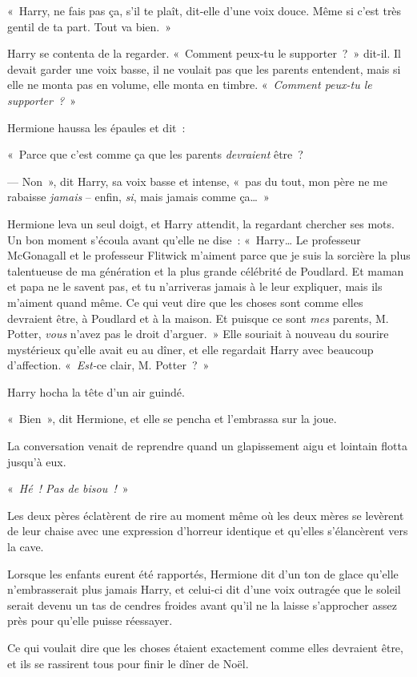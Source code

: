 «~Harry, ne fais pas ça, s'il te plaît, dit-elle d'une voix douce.
Même si c'est très gentil de ta part.
Tout va bien.~»

Harry se contenta de la regarder.
«~Comment peux-tu le supporter~?~»
dit-il. Il devait garder une voix basse, il ne voulait pas que les parents entendent, mais si elle ne monta pas en volume, elle monta en timbre.
«~\emph{Comment peux-tu le supporter~?}~»

Hermione haussa les épaules et dit~:

«~Parce que c'est comme ça que les parents \emph{devraient} être~?

--- Non~», dit Harry, sa voix basse et intense, «~pas du tout, mon père ne me rabaisse \emph{jamais} -- enfin, \emph{si}, mais jamais comme ça…~»

Hermione leva un seul doigt, et Harry attendit, la regardant chercher ses mots.
Un bon moment s'écoula avant qu'elle ne dise~: «~Harry…
Le professeur McGonagall et le professeur Flitwick m'aiment parce que je suis la sorcière la plus talentueuse de ma génération et la plus grande célébrité de Poudlard.
Et maman et papa ne le savent pas, et tu n'arriveras jamais à le leur expliquer, mais ils m'aiment quand même.
Ce qui veut dire que les choses sont comme elles devraient être, à Poudlard et à la maison.
Et puisque ce sont \emph{mes} parents, M. Potter, \emph{vous} n'avez pas le droit d'arguer.~»
Elle souriait à nouveau du sourire mystérieux qu'elle avait eu au dîner, et elle regardait Harry avec beaucoup d'affection.
«~\emph{Est-}ce clair, M. Potter~?~»

Harry hocha la tête d'un air guindé.

«~Bien~», dit Hermione, et elle se pencha et l'embrassa sur la joue.

\later

La conversation venait de reprendre quand un glapissement aigu et lointain flotta jusqu'à eux.

«~\emph{Hé~!
Pas de bisou~!}~»

Les deux pères éclatèrent de rire au moment même où les deux mères se levèrent de leur chaise avec une expression d'horreur identique et qu'elles s'élancèrent vers la cave.

Lorsque les enfants eurent été rapportés, Hermione dit d'un ton de glace qu'elle n'embrasserait plus jamais Harry, et celui-ci dit d'une voix outragée que le soleil serait devenu un tas de cendres froides avant qu'il ne la laisse s'approcher assez près pour qu'elle puisse réessayer.

Ce qui voulait dire que les choses étaient exactement comme elles devraient être, et ils se rassirent tous pour finir le dîner de Noël.

